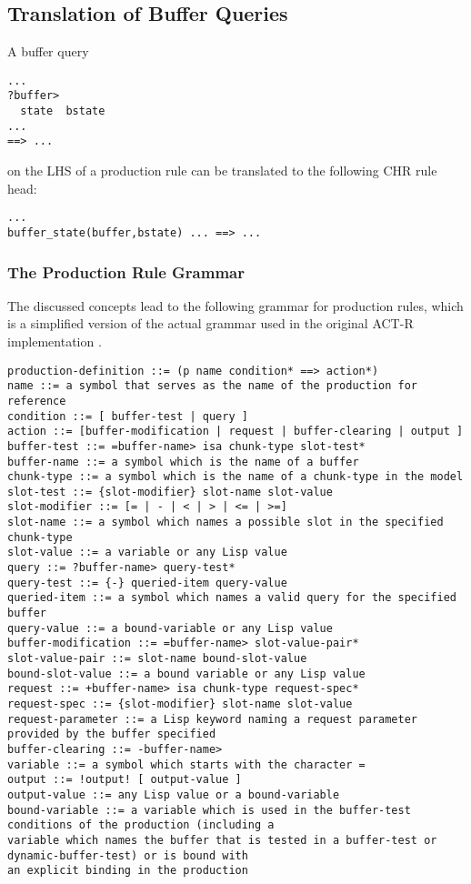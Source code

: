 \subsection{Translation of Buffer Queries}

A buffer query

\begin{lstlisting}
...
?buffer>
  state  bstate 
...
==> ...
\end{lstlisting}

on the LHS of a production rule can be translated to the following CHR rule head:

\begin{lstlisting}
...
buffer_state(buffer,bstate) ... ==> ...
\end{lstlisting}

\subsubsection{The Production Rule Grammar}

The discussed concepts lead to the following grammar for production rules, which is a simplified version of the actual grammar used in the original ACT-R implementation \cite[p. 162]{actr_reference}. 


\begin{lstlisting}
production-definition ::= (p name condition* ==> action*)
name ::= a symbol that serves as the name of the production for reference
condition ::= [ buffer-test | query ]
action ::= [buffer-modification | request | buffer-clearing | output ]
buffer-test ::= =buffer-name> isa chunk-type slot-test*
buffer-name ::= a symbol which is the name of a buffer
chunk-type ::= a symbol which is the name of a chunk-type in the model
slot-test ::= {slot-modifier} slot-name slot-value
slot-modifier ::= [= | - | < | > | <= | >=]
slot-name ::= a symbol which names a possible slot in the specified chunk-type
slot-value ::= a variable or any Lisp value
query ::= ?buffer-name> query-test*
query-test ::= {-} queried-item query-value
queried-item ::= a symbol which names a valid query for the specified buffer
query-value ::= a bound-variable or any Lisp value
buffer-modification ::= =buffer-name> slot-value-pair*
slot-value-pair ::= slot-name bound-slot-value
bound-slot-value ::= a bound variable or any Lisp value
request ::= +buffer-name> isa chunk-type request-spec*
request-spec ::= {slot-modifier} slot-name slot-value
request-parameter ::= a Lisp keyword naming a request parameter provided by the buffer specified
buffer-clearing ::= -buffer-name>
variable ::= a symbol which starts with the character =
output ::= !output! [ output-value ]
output-value ::= any Lisp value or a bound-variable
bound-variable ::= a variable which is used in the buffer-test conditions of the production (including a
variable which names the buffer that is tested in a buffer-test or dynamic-buffer-test) or is bound with
an explicit binding in the production
\end{lstlisting}

